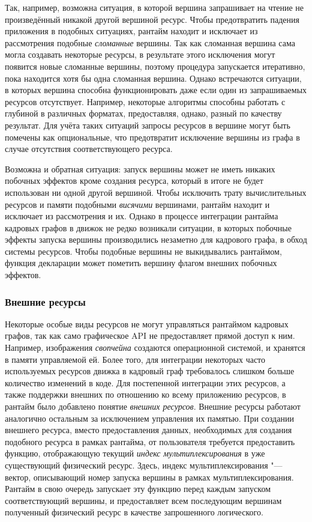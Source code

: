 Так, например, возможна ситуация, в которой вершина запрашивает на чтение не произведённый никакой другой вершиной ресурс.
Чтобы предотвратить падения приложения в подобных ситуациях, рантайм находит и исключает из рассмотрения подобные \textit{сломанные} вершины.
Так как сломанная вершина сама могла создавать некоторые ресурсы, в результате этого исключения могут появится новые сломанные вершины, поэтому процедура запускается итеративно, пока находится хотя бы одна сломанная вершина.
Однако встречаются ситуации, в которых вершина способна функционировать даже если один из запрашиваемых ресурсов отсутствует.
Например, некоторые алгоритмы способны работать с глубиной в различных форматах, предоставляя, однако, разный по качеству результат.
Для учёта таких ситуаций запросы ресурсов в вершине могут быть помечены как опциональные, что предотвратит исключение вершины из графа в случае отсутствия соответствующего ресурса.

Возможна и обратная ситуация: запуск вершины может не иметь никаких побочных эффектов кроме создания ресурса, который в итоге не будет использован ни одной другой вершиной.
Чтобы исключить трату вычислительных ресурсов и памяти подобными \textit{висячими} вершинами, рантайм находит и исключает из рассмотрения и их.
Однако в процессе интеграции рантайма кадровых графов в движок не редко возникали ситуации, в которых побочные эффекты запуска вершины производились незаметно для кадрового графа, в обход системы ресурсов.
Чтобы подобные вершины не выкидывались рантаймом, функция декларации может пометить вершину флагом внешних побочных эффектов.

\subsubsection{Внешние ресурсы}
Некоторые особые виды ресурсов не могут управляться рантаймом кадровых графов, так как само графическое API не предоставляет прямой доступ к ним.
Например, изображения \textit{свопчейна} создаются операционной системой, и хранятся в памяти управляемой ей.
Более того, для интеграции некоторых часто используемых ресурсов движка в кадровый граф требовалось слишком больше количество изменений в коде.
Для постепенной интеграции этих ресурсов, а также поддержки внешних по отношению ко всему приложению ресурсов, в рантайм было добавлено понятие \textit{внешних ресурсов}.
Внешние ресурсы работают аналогично остальным за исключением управления их памятью.
При создании внешнего ресурса, вместо предоставления данных, необходимых для создания подобного ресурса в рамках рантайма, от пользователя требуется предоставить функцию, отображающую текущий \textit{индекс мультиплексирования} в уже существующий физический ресурс.
Здесь, индекс мультиплексирования "--- вектор, описывающий номер запуска вершины в рамках мультиплексирования.
Рантайм в свою очередь запускает эту функцию перед каждым запуском соответствующий вершины, и предоставляет всем последующим вершинам полученный физический ресурс в качестве запрошенного логического.

